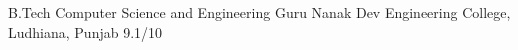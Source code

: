     {B.Tech}
    {Computer Science and Engineering}
    {Guru Nanak Dev Engineering College, Ludhiana, Punjab}
    {9.1/10}
    {}

